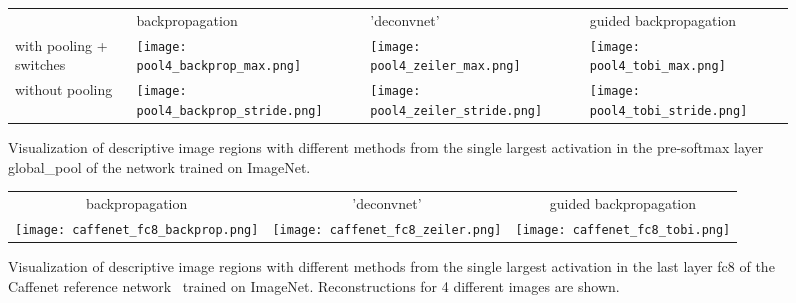 \documentclass{article} \usepackage{iclr2015,times}
\begin{document}
\begin{appendix}
\begin{figure}[h]
\begin{center}
\begin{tabular}{ >{\centering\arraybackslash} m{1.5cm} >{\centering\arraybackslash} m{3.5cm} >{\centering\arraybackslash} m{3.5cm} >{\centering\arraybackslash} m{3.5cm} }
   & backpropagation & 'deconvnet' & guided backpropagation \\
  with pooling + switches & 
  \texttt{[image: pool4\_backprop\_max.png]} &
  \texttt{[image: pool4\_zeiler\_max.png]} &
  \texttt{[image: pool4\_tobi\_max.png]} \\
  without pooling & 
  \texttt{[image: pool4\_backprop\_stride.png]} &
  \texttt{[image: pool4\_zeiler\_stride.png]} &
  \texttt{[image: pool4\_tobi\_stride.png]} 
\end{tabular}
\end{center}
\caption{Visualization of descriptive image regions with different methods from the single largest activation in the pre-softmax layer global\_pool of the network trained on ImageNet.}
\label{fig:pool4_different_methods}
\end{figure}

\begin{figure}[h]
\begin{center}
\begin{tabular}{c|c|c}
   backpropagation & 'deconvnet' & guided backpropagation \\
  \texttt{[image: caffenet\_fc8\_backprop.png]} &
  \texttt{[image: caffenet\_fc8\_zeiler.png]} &
  \texttt{[image: caffenet\_fc8\_tobi.png]} 
\end{tabular}
\end{center}
\caption{Visualization of descriptive image regions with different methods from the single largest activation in the last layer fc8 of the Caffenet reference network~\citep{caffe} trained on ImageNet. Reconstructions for 4 different images are shown.}
\label{fig:fc8_caffenet}
\end{figure}


\end{appendix}
\end{document}
